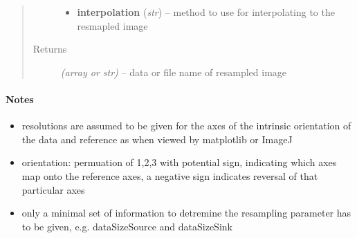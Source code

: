 \documentclass[letterpaper,10pt,english]{sphinxmanual}
\begin{document}
\begin{fulllineitems}
\begin{quote}
\begin{description}
\begin{itemize}
\item {} 
\textbf{interpolation} (\emph{str}) --
method to use for interpolating to the resmapled image

\end{itemize}

\item[{Returns}] \leavevmode
\emph{(array or str)} --
data or file name of resampled image

\end{description}\end{quote}
\paragraph{Notes}
\begin{itemize}
\item {} 
resolutions are assumed to be given for the axes of the intrinsic
orientation of the data and reference as when viewed by matplotlib or ImageJ

\item {} 
orientation: permuation of 1,2,3 with potential sign, indicating which
axes map onto the reference axes, a negative sign indicates reversal
of that particular axes

\item {} 
only a minimal set of information to detremine the resampling parameter
has to be given, e.g. dataSizeSource and dataSizeSink

\end{itemize}

\end{fulllineitems}

\end{document}
